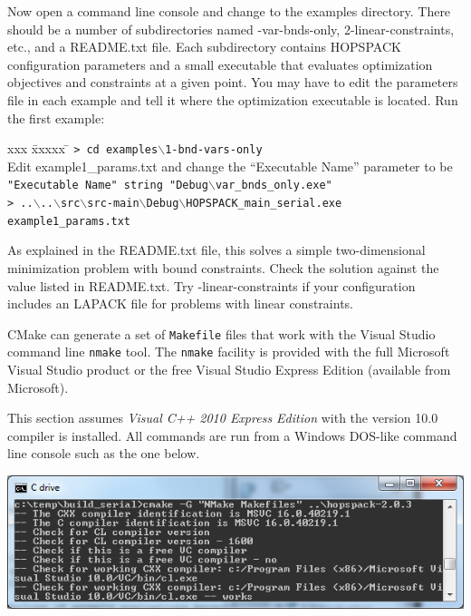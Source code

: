 Now open a command line console and change to the {\sf examples} directory.
There should be a number of
subdirectories named {-var-bnds-only, 2-linear-constraints}, etc.,
and a {\sf README.txt} file.  Each subdirectory contains HOPSPACK
configuration parameters and a small executable that evaluates optimization
objectives and constraints at a given point.
You may have to edit the parameters file in each example and tell it where
the optimization executable is located.
Run the first example:
\vspace{-11pt}
\begin{tabbing}
  xxx \= xxxxx \= \kill
  \> {\tt > cd examples$\backslash$1-bnd-vars-only} \\
  \> Edit {\sf example1\_params.txt} and change the ``Executable Name'' parameter
     to be \\
  \> \> {\tt "Executable Name" string "Debug$\backslash$var\_bnds\_only.exe"} \\
  \> {\tt > ..$\backslash$..$\backslash$src$\backslash$src-main$\backslash$Debug$\backslash$HOPSPACK\_main\_serial.exe example1\_params.txt}
\end{tabbing}
\vspace{-11pt}
As explained in the {\sf README.txt} file, this solves a simple two-dimensional
minimization problem with bound constraints.  Check the solution against
the value listed in {\sf README.txt}.
Try {-linear-constraints} if your configuration includes an LAPACK file
for problems with linear constraints.


\bigskip
{}
CMake can generate a set of {\tt Makefile} files that work with the
Visual Studio command line {\tt nmake} tool.  The {\tt nmake} facility is
provided with the full Microsoft Visual Studio product or the free
Visual Studio Express Edition (available from Microsoft).

This section assumes {\it Visual C++ 2010 Express Edition} with the
version 10.0 compiler is installed.  All commands are run from
a Windows DOS-like command line console such as the one below.

\begin{center}
\includegraphics[width=5.5in]{winconsole_cmake.png}
\end{center}


